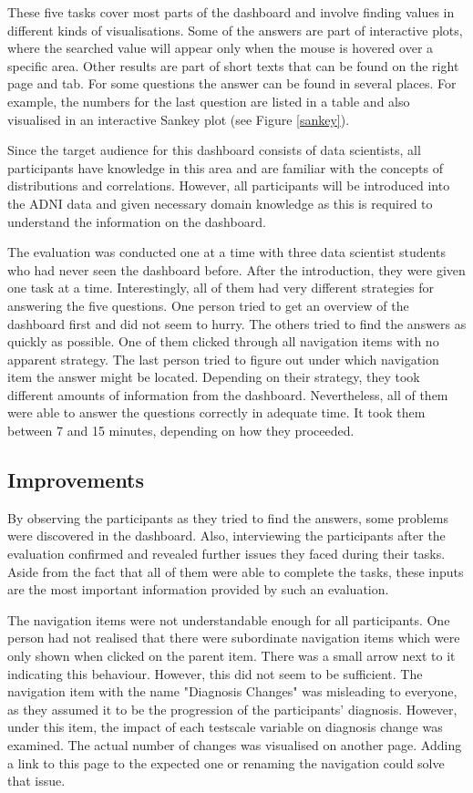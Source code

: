 \documentclass[11pt]{article}
\begin{document}
These five tasks cover most parts of the dashboard and involve finding values in different kinds of visualisations. Some of the answers are part of interactive plots, where the searched value will appear only when the mouse is hovered over a specific area. Other results are part of short texts that can be found on the right page and tab. For some questions the answer can be found in several places. For example, the numbers for the last question are listed in a table and also visualised in an interactive Sankey plot (see Figure \ref{sankey}).

Since the target audience for this dashboard consists of data scientists, all participants have knowledge in this area and are familiar with the concepts of distributions and correlations. However, all participants will be introduced into the ADNI data and given necessary domain knowledge as this is required to understand the information on the dashboard.

The evaluation was conducted one at a time with three data scientist students who had never seen the dashboard before. After the introduction, they were given one task at a time. Interestingly, all of them had very different strategies for answering the five questions. One person tried to get an overview of the dashboard first and did not seem to hurry. The others tried to find the answers as quickly as possible. One of them clicked through all navigation items with no apparent strategy. The last person tried to figure out under which navigation item the answer might be located. Depending on their strategy, they took different amounts of information from the dashboard. Nevertheless, all of them were able to answer the questions correctly in adequate time. It took them between 7 and 15 minutes, depending on how they proceeded.

\subsection{Improvements}

By observing the participants as they tried to find the answers, some problems were discovered in the dashboard. Also, interviewing the participants after the evaluation confirmed and revealed further issues they faced during their tasks. Aside from the fact that all of them were able to complete the tasks, these inputs are the most important information provided by such an evaluation.

The navigation items were not understandable enough for all participants. One person had not realised that there were subordinate navigation items which were only shown when clicked on the parent item. There was a small arrow next to it indicating this behaviour. However, this did not seem to be sufficient. The navigation item with the name "Diagnosis Changes" was misleading to everyone, as they assumed it to be the progression of the participants' diagnosis. However, under this item, the impact of each testscale variable on diagnosis change was examined. The actual number of changes was visualised on another page. Adding a link to this page to the expected one or renaming the navigation could solve that issue.
\end{document}
